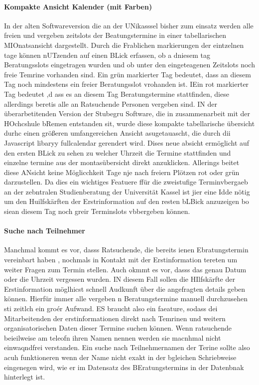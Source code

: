 \documentclass[12pt]{article}
\begin{document}
\paragraph{Kompakte Ansicht Kalender (mit Farben)}
In der alten Softwareversion die an der UNikasssel bisher zum einsatz  werden alle freien und vergeben zeitslots der Beatungstermine in einer tabellarischen MIOnatsansicht dargestellt.  Durch die Frablichen markierungen der eintzelnen tage können nUTzenden auf einen BLick erfassen, ob a dniesem tag Beratungsslots eingetragen wurden und ob unter den eingeteagenen Zeitslots noch freie Temrine vorhanden sind. Ein grün markierter Tag bedeutet, dass an diesem Tag noch mindestens ein freier Beratungsslot vrohanden ist. IEin rot markierter Tag bedeutet ,d ass es an diesem Tag Beratungstermine stattfinden, diese allerdings beretis alle an Ratsuchende Personen vergeben sind.
IN der überarbetitenden Version der Stubegru Software, die in zusammenarbeit mit der HOchcshule bRemen entstanden sit, wurde diese kompakte tabellarische übersicht durhc einen größeren umfangereichen Ansicht  asugetauascht, die durch dii Javascript libaryy fullcalendar gerendert wird. Dises neue absicht ermöglicht auf den ersten BLick zu sehen zu welcher Uhrzeit die Termine stattfinden und einzelne termine aus der montasübersicht direkt anzuklicken. Allerings beitet diese ANsicht keine Möglicchkeit Tage nje nach freiern Plötzen rot oder grün darzustellen. Da dies ein wichtiges Featuere ffür die zweistufige Terminvbergaeb an der zebntralen Studienberatung der Universität Kassel ist jier eine Idde nötig um den Huilfskärften der Erstrinformation auf den resten bLBick anzuzeigen bo siean diesem Tag noch greir Terminslots vbbergeben können.

\paragraph{Suche nach Teilnehmer}
Manchmal kommt es vor, dasss Ratsuchende, die bereits ienen Ebratungstermin vereinbart haben , nochmals in Kontakt mit der Erstinformation tereten um weiter Fragen zum Termin stellen. Auch okmmt es vor, dasss das genau Datum oder die Uhrzeit vergessen wurden. IN diesem Fall sollen die HIlfskärfte der Erstinformation möglhicst schnell Audkunft über die angefragten details geben können. Hierfür immer alle vergeben n Beratungstermine manuell durchzusehen sti zeitlch ein groér Aufwand. ES braucht also ein faeature, sodass dei Mitarbeitenden der erstinformationen direkt nach Temrinen und weitern organisatorischen Daten dieser Termine suchen können. Wenn ratsuchende beieilweise am teleofn ihren Namen nennen werden sie macnhmal nicht einwaqndfrei verstanden. Ein suche nach Teilnehmernamen der Terine sollte also acuh funktioneren wenn der Name nicht exakt in der bgleichen Schriebweise eingenegen wird, wie er im Datensatz des BEratungstermins in der Datenbnak hinterlegt ist. 
\end{document}
